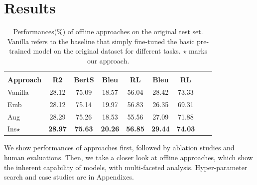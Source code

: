 

\section{Results}
\label{sec:results}

\begin{table}[h]
	\scriptsize
	\centering
	\begin{tabular}{l|cccccccc}
		\toprule[1pt]
		& & 
		&   \\
		
		{\textbf{Approach}}  & \textbf{R2} & \textbf{BertS} & \textbf{Bleu} & \textbf{RL} & \textbf{Bleu} & \textbf{RL}\\
		\hline
		Vanilla & 28.12 &  75.09 & 18.57 & 56.04& 28.42&73.33  \\
		Emb & 28.12 & 75.14 & 19.97 & 56.83 & 26.35 & 69.31 \\
		Aug  & 28.29 &  75.26 & 18.53 & 55.56&27.09 & 71.88 \\
		
		
		Ins$\star$  & \textbf{28.97} & \textbf{75.63} & \textbf{20.26} & \textbf{56.85} & \textbf{29.44} & \textbf{74.03}\\	
		
		
		\bottomrule[1pt]
	\end{tabular}
	\caption{Performances(\%) of offline approaches on the original test set. Vanilla refers to the baseline that simply fine-tuned the basic pre-trained model on the original dataset for different tasks. $\star$ marks our approach.}
	\label{tab:mdresults-vanilla}
\end{table}


We show performances of approaches first, followed by ablation studies and human evaluations.
Then, we take a closer look at offline approaches, which show the inherent capability of models, with multi-faceted analysis. Hyper-parameter search and case studies are in Appendixes.%


